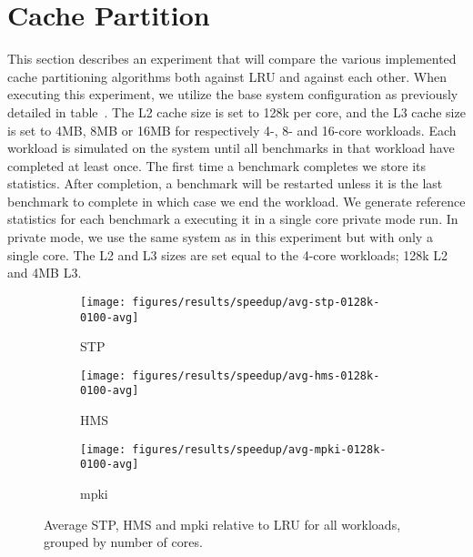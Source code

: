 
\section{Cache Partition}
\label{sec:results:cache_partition}

This section describes an experiment that will compare the various implemented cache partitioning algorithms both against LRU and against each other.
When executing this experiment, we utilize the base system configuration as previously detailed in table~.
The L2 cache size is set to 128k per core, and the L3 cache size is set to 4MB, 8MB or 16MB for respectively 4-, 8- and 16-core workloads.
Each workload is simulated on the system until all benchmarks in that workload have completed at least once. 
The first time a benchmark completes we store its statistics.
After completion, a benchmark will be restarted unless it is the last benchmark to complete in which case we end the workload.
We generate reference statistics for each benchmark a executing it in a single core private mode run.
In private mode, we use the same system as in this experiment but with only a single core.
The L2 and L3 sizes are set equal to the 4-core workloads; 128k L2 and 4MB L3.

\begin{figure}[!htb]
    \centering
    \begin{subfigure}[b]{0.5\textwidth}
        \texttt{[image: figures/results/speedup/avg-stp-0128k-0100-avg]}
        \caption{STP}
        \label{fig:results:base:avg:stp}
    \end{subfigure}%
    \begin{subfigure}[b]{0.5\textwidth}
        \texttt{[image: figures/results/speedup/avg-hms-0128k-0100-avg]}
        \caption{HMS}
        \label{fig:results:base:avg:hms}
    \end{subfigure}
    \begin{subfigure}[b]{0.5\textwidth}
        \texttt{[image: figures/results/speedup/avg-mpki-0128k-0100-avg]}
        \caption{mpki}
        \label{fig:results:base:avg:mpki}
    \end{subfigure}
    \caption{Average STP, HMS and mpki relative to LRU for all workloads, grouped by number of cores.}
    \label{fig:results:base:avg}
\end{figure}

